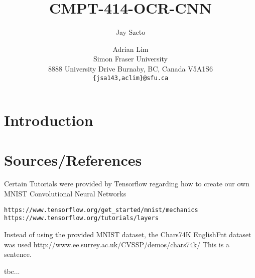 \documentclass[11pt,letterpaper]{article}
\title{CMPT-414-OCR-CNN}
\author{Jay Szeto \and Adrian Lim \\
  Simon Fraser University\\
  8888 University Drive
  Burnaby, BC, Canada V5A1S6 \\
  {\tt \{jsa143,aclim\}@sfu.ca} \\}
\begin{document}
\maketitle

\section{Introduction}

\section{Sources/References}
Certain Tutorials were provided by Tensorflow regarding how to create our own MNIST Convolutional Neural Networks
\begin{verbatim}
https://www.tensorflow.org/get_started/mnist/mechanics
https://www.tensorflow.org/tutorials/layers
\end{verbatim}

Instead of using the provided MNIST dataset, the Chars74K EnglishFnt dataset was used
http://www.ee.surrey.ac.uk/CVSSP/demos/chars74k/
This is a sentence.~\cite{deCampos09}

tbc...



\end{document}
